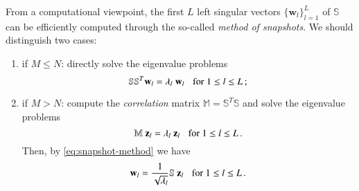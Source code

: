 \documentclass{elsarticle}
\theoremstyle{theorem}
\theoremstyle{definition}
\theoremstyle{remark}
\theoremstyle{proposition}
\numberwithin{figure}{section}
\begin{document}
		\noindent From a computational viewpoint, the first $L$ left singular vectors $\big\lbrace \mathbf{w}_l \big\rbrace_{l = 1}^L$ of $\mathbb{S}$ can be efficiently computed through the so-called \emph{method of snapshots}. We should distinguish two cases:
		\begin{enumerate}[label=(\alph*)]
			\item if $M \leq N$: directly solve the eigenvalue problems
			\begin{equation*}
				\mathbb{S} \mathbb{S}^T \mathbf{w}_l = \lambda_l ~ \mathbf{w}_l \hspace*{0.3cm} \text{for $1 \leq l \leq L$} \, ;
			\end{equation*}
			\item if $M > N$: compute the \emph{correlation} matrix $\mathbb{M} = \mathbb{S}^T \mathbb{S}$ and solve the eigenvalue problems
			\begin{equation*}
				\mathbb{M} ~ \mathbf{z}_l = \lambda_l ~ \mathbf{z}_l \hspace*{0.3cm} \text{for $1 \leq l \leq L$} \, .
			\end{equation*} 
			Then, by \eqref{eq:snapshot-method} we have
			\begin{equation*}
				\mathbf{w}_l = \dfrac{1}{\sqrt{\lambda_l}} \mathbb{S} ~ \mathbf{z}_l \hspace*{0.3cm} \text{for $1 \leq l \leq L$} \, .
			\end{equation*}
		\end{enumerate}
		
\end{document}
